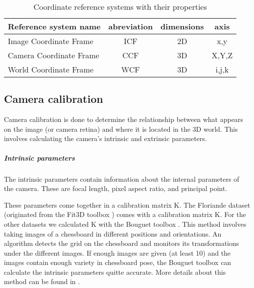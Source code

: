 \begin{table}[ht]
	\caption{Coordinate reference systems with their properties}
	\label{tab:coord}
	\begin{tabular}{|l||c|c|c|}
	\hline
	Reference system name		&	abreviation	&	dimensions	&	axis\\
	\hline
	\hline
	Image Coordinate Frame	&   ICF			&	2D			& 	x,y\\
	\hline
	Camera Coordinate Frame	&   CCF			&	3D			& 	X,Y,Z\\
	\hline
	World Coordinate Frame	&   WCF			&	3D			& 	i,j,k\\
	\hline
	\end{tabular}
\end{table}


%  
%  

\subsection{Camera calibration}
\label{sec:cameraCalibration}
Camera calibration is done to determine
the relationship between what appears on the image (or camera retina) and where
 it is located in the 3D world. This involves calculating the camera's intrinsic
 and extrinsic parameters.

\subparagraph{Intrinsic parameters}
The intrinsic parameters contain information about the internal parameters
of the camera.  These are focal length, pixel aspect ratio, and principal point.

These parameters come together in a calibration matrix K.  The Floriande
dataset (originated from the Fit3D toolbox \cite{FIT3D}) comes with a
calibration matrix K.  For
the other datasets we calculated K with the Bouguet toolbox
\cite{bouguet}.
This method involves taking images of a chessboard in different positions and
orientations. An algorithm detects the grid on the chessboard and monitors its
transformations under the different images.  If enough images are given (at
least 10) and the images contain enough variety in chessboard pose, the Bouguet
toolbox can calculate the intrinsic parameters quitte accurate.
More details about this method can be found in \cite{bouguet}.

